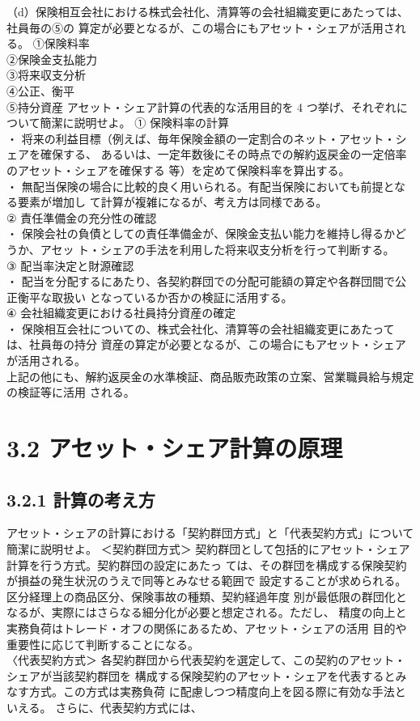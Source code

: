 \documentclass[report,gutter=10mm,fore-edge=10mm,uplatex,dvipdfmx]{jlreq}
\begin{document}
（d）保険相互会社における株式会社化、清算等の会社組織変更にあたっては、社員毎の⑤の
算定が必要となるが、この場合にもアセット・シェアが活用される。
\answer{}
\noindent ①保険料率\\②保険金支払能力\\
③将来収支分析\\④公正、衡平\\⑤持分資産
アセット・シェア計算の代表的な活用目的を 4 つ挙げ、それぞれについて簡潔に説明せよ。
\answer{}
\noindent
① 保険料率の計算\\
・ 将来の利益目標（例えば、毎年保険金額の一定割合のネット・アセット・シェアを確保する、
あるいは、一定年数後にその時点での解約返戻金の一定倍率のアセット・シェアを確保する
等）を定めて保険料率を算出する。\\
・ 無配当保険の場合に比較的良く用いられる。有配当保険においても前提となる要素が増加し
て計算が複雑になるが、考え方は同様である。\\
② 責任準備金の充分性の確認\\
・ 保険会社の負債としての責任準備金が、保険金支払い能力を維持し得るかどうか、アセッ
ト・シェアの手法を利用した将来収支分析を行って判断する。\\
③ 配当率決定と財源確認\\
・ 配当を分配するにあたり、各契約群団での分配可能額の算定や各群団間で公正衡平な取扱い
となっているか否かの検証に活用する。\\
④ 会社組織変更における社員持分資産の確定\\
・ 保険相互会社についての、株式会社化、清算等の会社組織変更にあたっては、社員毎の持分
資産の算定が必要となるが、この場合にもアセット・シェアが活用される。\\
上記の他にも、解約返戻金の水準検証、商品販売政策の立案、営業職員給与規定の検証等に活用
される。

\section{3.2 アセット・シェア計算の原理}
\subsection{3.2.1 計算の考え方}
アセット・シェアの計算における「契約群団方式」と「代表契約方式」について簡潔に説明せよ。
\answer{}
\noindent
＜契約群団方式＞
契約群団として包括的にアセット・シェア計算を行う方式。契約群団の設定にあたっ
ては、その群団を構成する保険契約が損益の発生状況のうえで同等とみなせる範囲で
設定することが求められる。区分経理上の商品区分、保険事故の種類、契約経過年度
別が最低限の群団化となるが、実際にはさらなる細分化が必要と想定される。ただし、
精度の向上と実務負荷はトレード・オフの関係にあるため、アセット・シェアの活用
目的や重要性に応じて判断することになる。\\
〈代表契約方式＞
各契約群団から代表契約を選定して、この契約のアセット・シェアが当該契約群団を
構成する保険契約のアセット・シェアを代表するとみなす方式。この方式は実務負荷
に配慮しつつ精度向上を図る際に有効な手法といえる。
さらに、代表契約方式には、
\end{document}
